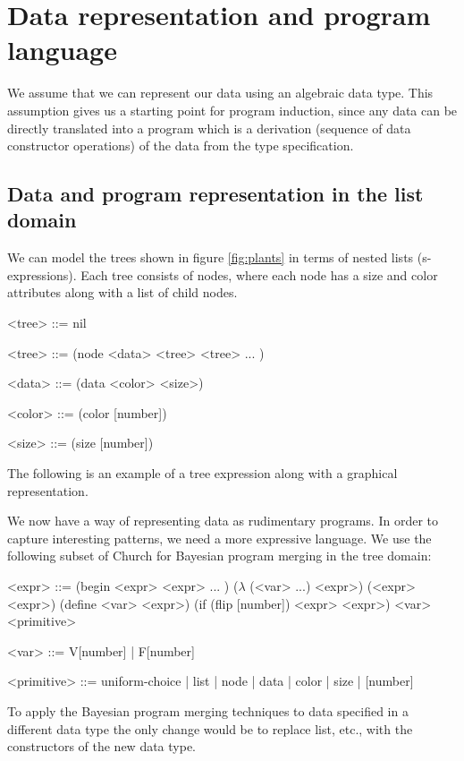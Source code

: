 \documentclass[a4paper,10pt]{article}
\begin{document}
\newpage
\section{Data representation and program language}
We assume that we can represent our data using an algebraic data type. This assumption gives us a starting point for program induction, since any data can be directly translated into a program which is a derivation (sequence of data constructor operations) of the data from the type specification. 
\subsection{Data and program representation in the list domain}
We can model the trees shown in figure \ref{fig:plants} in terms of nested lists (s-expressions).  Each tree consists of nodes, where each node has a size and color attributes along with a list of child nodes.
\begin{grammar}
<tree> ::= nil

<tree> ::= (node <data> <tree> <tree> ... )

<data> ::= (data <color> <size>)

<color> ::= (color [number])

<size> ::= (size [number])
\end{grammar}
The following is an example of a tree expression along with a graphical representation.
\begin{figure}[h]
  \subfloat{}
  \hspace{40pt} %
\end{figure}

We now have a way of representing data as rudimentary programs.  In order to capture interesting patterns, we need a more expressive language.  We use the following subset of Church for Bayesian program merging in the tree domain:
\begin{grammar}
<expr> ::= (begin <expr> <expr> ... ) 
\alt ($\lambda$ (<var> ...) <expr>)
\alt (<expr> <expr>)  
\alt (define <var> <expr>)
\alt (if (flip [number]) <expr> <expr>)
\alt <var> 
\alt <primitive>

<var> ::= V[number] | F[number] 

<primitive> ::= uniform-choice | list | node | data | color | size | [number]
\end{grammar}
To apply the Bayesian program merging techniques to data specified in a different data type the only change would be to replace list, etc., with the constructors of the new data type.
\end{document}
